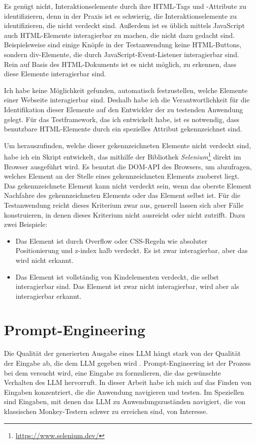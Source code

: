 Es genügt nicht, Interaktionselemente durch ihre HTML-Tags und -Attribute zu identifizieren, denn in der Praxis ist es schwierig, die Interaktionselemente zu identifizieren, die nicht verdeckt sind.
Außerdem ist es üblich mittels JavaScript auch HTML-Elemente interagierbar zu machen, die nicht dazu gedacht sind.
Beispielsweise sind einige Knöpfe in der Testanwendung keine HTML-Buttons, sondern div-Elemente, die durch JavaScript-Event-Listener interagierbar sind.
Rein auf Basis des HTML-Dokuments ist es nicht möglich, zu erkennen, dass diese Elemente interagierbar sind.

Ich habe keine Möglichkeit gefunden, automatisch festzustellen, welche Elemente einer Webseite interagierbar sind.
Deshalb habe ich die Verantwortlichkeit für die Identifikation dieser Elemente auf den Entwickler der zu testenden Anwendung gelegt.
Für das Test\-frame\-work, das ich entwickelt habe, ist es notwendig, dass benutzbare HTML-Elemente durch ein spezielles Attribut gekennzeichnet sind.

Um herauszufinden, welche dieser gekennzeichneten Elemente nicht verdeckt sind, habe ich ein Skript entwickelt, das mithilfe der Bibliothek \textit{Selenium}\footnote{\url{https://www.selenium.dev/}} direkt im Browser ausgeführt wird.
Es benutzt die DOM-API des Browsers, um abzufragen, welches Element an der Stelle eines gekennzeichneten Elements zuoberst liegt.
Das gekennzeichnete Element kann nicht verdeckt sein, wenn das oberste Element Nachfahre des gekennzeichneten Elements oder das Element selbst ist.
Für die Testanwendung reicht dieses Kriterium zwar aus, generell lassen sich aber Fälle konstruieren, in denen dieses Kriterium nicht ausreicht oder nicht zutrifft.
Dazu zwei Beispiele:
\begin{itemize}
    \item Das Element ist durch Overflow oder CSS-Regeln wie absoluter Positionierung und z-index halb verdeckt. Es ist zwar interagierbar, aber das wird nicht erkannt.
    \item Das Element ist vollständig von Kindelementen verdeckt, die selbst interagierbar sind. Das Element ist zwar nicht interagierbar, wird aber als interagierbar erkannt.
\end{itemize}

\section{Prompt-Engineering}
\label{sec:prompt-engineering}

Die Qualität der generierten Ausgabe eines LLM hängt stark von der Qualität der Eingabe ab, die dem LLM gegeben wird \cite{chain-of-thought}.
Prompt-Engineering ist der Prozess bei dem versucht wird, eine Eingabe zu formulieren, die das gewünschte Verhalten des LLM hervorruft.
In dieser Arbeit habe ich mich auf das Finden von Eingaben konzentriert, die die Anwendung navigieren und testen.
Im Speziellen sind Eingaben, mit denen das LLM zu Anwendungszuständen navigiert, die von klassischen Monkey-Testern schwer zu erreichen sind, von Interesse.

